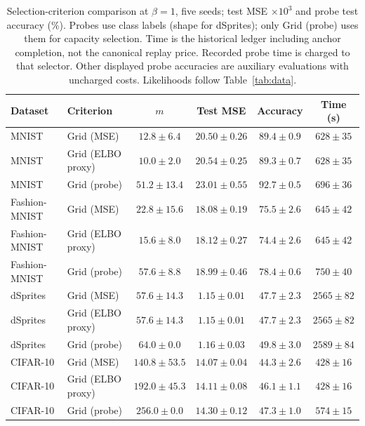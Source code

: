 \documentclass[make,article,submit,pdftex,moreauthors]{Definitions/mdpi}
\begin{document}
\begin{table}[H]
\caption{Selection-criterion comparison at $\beta=1$, five seeds; test MSE $\times10^3$ and probe test accuracy (\%). Probes use class labels (shape for dSprites); only Grid (probe) uses them for capacity selection. Time is the historical ledger including anchor completion, not the canonical replay price. Recorded probe time is charged to that selector. Other displayed probe accuracies are auxiliary evaluations with uncharged costs. Likelihoods follow Table~\ref{tab:data}.}\label{tab:selection}
\footnotesize
\setlength{\tabcolsep}{3.5pt}
\begin{tabular*}{\textwidth}{@{\extracolsep{\fill}}llcccc@{}}
\toprule
Dataset & Criterion & $m$ & Test MSE & Accuracy & Time (s) \\
\midrule
MNIST & Grid (MSE) & $12.8 \pm 6.4$ & $20.50 \pm 0.26$ & $89.4 \pm 0.9$ & $628 \pm 35$ \\
MNIST & Grid (ELBO proxy) & $10.0 \pm 2.0$ & $20.54 \pm 0.25$ & $89.3 \pm 0.7$ & $628 \pm 35$ \\
MNIST & Grid (probe) & $51.2 \pm 13.4$ & $23.01 \pm 0.55$ & $92.7 \pm 0.5$ & $696 \pm 36$ \\
Fashion-MNIST & Grid (MSE) & $22.8 \pm 15.6$ & $18.08 \pm 0.19$ & $75.5 \pm 2.6$ & $645 \pm 42$ \\
Fashion-MNIST & Grid (ELBO proxy) & $15.6 \pm 8.0$ & $18.12 \pm 0.27$ & $74.4 \pm 2.6$ & $645 \pm 42$ \\
Fashion-MNIST & Grid (probe) & $57.6 \pm 8.8$ & $18.99 \pm 0.46$ & $78.4 \pm 0.6$ & $750 \pm 40$ \\
dSprites & Grid (MSE) & $57.6 \pm 14.3$ & $1.15 \pm 0.01$ & $47.7 \pm 2.3$ & $2565 \pm 82$ \\
dSprites & Grid (ELBO proxy) & $57.6 \pm 14.3$ & $1.15 \pm 0.01$ & $47.7 \pm 2.3$ & $2565 \pm 82$ \\
dSprites & Grid (probe) & $64.0 \pm 0.0$ & $1.16 \pm 0.03$ & $49.8 \pm 3.0$ & $2589 \pm 84$ \\
CIFAR-10 & Grid (MSE) & $140.8 \pm 53.5$ & $14.07 \pm 0.04$ & $44.3 \pm 2.6$ & $428 \pm 16$ \\
CIFAR-10 & Grid (ELBO proxy) & $192.0 \pm 45.3$ & $14.11 \pm 0.08$ & $46.1 \pm 1.1$ & $428 \pm 16$ \\
CIFAR-10 & Grid (probe) & $256.0 \pm 0.0$ & $14.30 \pm 0.12$ & $47.3 \pm 1.0$ & $574 \pm 15$ \\
\bottomrule
\end{tabular*}
\end{table}
\end{document}
